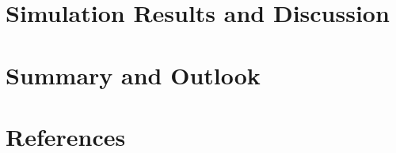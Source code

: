 \documentclass[11pt]{article}
\begin{document}
\section{Simulation Results and Discussion}

\section{Summary and Outlook}

\section{References}
\end{document}
